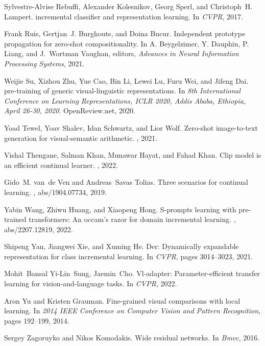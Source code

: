 \documentclass[10pt,twocolumn,letterpaper]{article}
\begin{document}
{\begin{thebibliography}{10}
Sylvestre-Alvise Rebuffi, Alexander Kolesnikov, Georg Sperl, and Christoph~H.
  Lampert.
 incremental classifier and representation learning.
\newblock In {\em CVPR}, 2017.

Frank Ruis, Gertjan~J. Burghouts, and Doina Bucur.
\newblock Independent prototype propagation for zero-shot compositionality.
\newblock In A. Beygelzimer, Y. Dauphin, P. Liang, and J.~Wortman Vaughan,
  editors, {\em Advances in Neural Information Processing Systems}, 2021.

Weijie Su, Xizhou Zhu, Yue Cao, Bin Li, Lewei Lu, Furu Wei, and Jifeng Dai.
 pre-training of generic visual-linguistic representations.
\newblock In {\em 8th International Conference on Learning Representations,
  {ICLR} 2020, Addis Ababa, Ethiopia, April 26-30, 2020}. OpenReview.net, 2020.

Yoad Tewel, Yoav Shalev, Idan Schwartz, and Lior Wolf.
\newblock Zero-shot image-to-text generation for visual-semantic arithmetic.
, 2021.

Vishal Thengane, Salman Khan, Munawar Hayat, and Fahad Khan.
\newblock Clip model is an efficient continual learner.
, 2022.

Gido~M. van~de Ven and Andreas~Savas Tolias.
\newblock Three scenarios for continual learning.
, abs/1904.07734, 2019.

Yabin Wang, Zhiwu Huang, and Xiaopeng Hong.
\newblock S-prompts learning with pre-trained transformers: An occam's razor
  for domain incremental learning.
, abs/2207.12819, 2022.

Shipeng Yan, Jiangwei Xie, and Xuming He.
\newblock Der: Dynamically expandable representation for class incremental
  learning.
\newblock In {\em CVPR}, pages 3014--3023, 2021.

Mohit~Bansal Yi-Lin~Sung, Jaemin~Cho.
\newblock Vl-adapter: Parameter-efficient transfer learning for
  vision-and-language tasks.
\newblock In {\em CVPR}, 2022.

Aron Yu and Kristen Grauman.
\newblock Fine-grained visual comparisons with local learning.
\newblock In {\em 2014 IEEE Conference on Computer Vision and Pattern
  Recognition}, pages 192--199, 2014.

Sergey Zagoruyko and Nikos Komodakis.
\newblock Wide residual networks.
\newblock In {\em Bmvc}, 2016.

\end{thebibliography}

}
\end{document}
